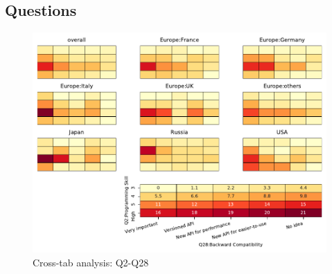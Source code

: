 
\subsection{Questions}


\begin{figure}
\begin{center}
\includegraphics[width=12cm]{../pdfs/Q2-Q28.pdf}
\caption{Cross-tab analysis: Q2-Q28}
\label{fig:Q2-Q28}
\end{center}
\end{figure}
